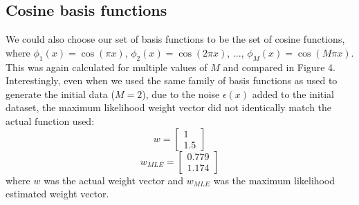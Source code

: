 \documentclass{article}
\begin{document}
\subsection{Cosine basis functions}
We could also choose our set of basis functions to be the set of cosine functions, where $\phi_1(x) = \cos(\pi x)$, $\phi_2(x) = \cos(2 \pi x)$, ..., $\phi_M(x) = \cos(M \pi x)$. This was again calculated for multiple values of $M$ and compared in Figure 4. Interestingly, even when we used the same family of basis functions as used to generate the initial data ($M=2$), due to the noise $\epsilon(x)$ added to the initial dataset, the maximum likelihood weight vector did not identically match the actual function used:
$$ w =
\begin{bmatrix}
  1 \\
  1.5
\end{bmatrix}$$
$$ w_{MLE} =
\begin{bmatrix}
  0.779 \\
  1.174
\end{bmatrix}$$
where $w$ was the actual weight vector and $w_{MLE}$ was the maximum likelihood estimated weight vector.
\end{document}
